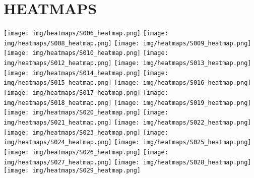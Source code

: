     \section{HEATMAPS}

        \begin{multicols}{2} \centering \noindent
            \texttt{[image: img/heatmaps/S006\_heatmap.png]}
            \texttt{[image: img/heatmaps/S008\_heatmap.png]}
            \texttt{[image: img/heatmaps/S009\_heatmap.png]}
            \texttt{[image: img/heatmaps/S010\_heatmap.png]}
            \texttt{[image: img/heatmaps/S012\_heatmap.png]}
            \texttt{[image: img/heatmaps/S013\_heatmap.png]}
            \texttt{[image: img/heatmaps/S014\_heatmap.png]}
            \texttt{[image: img/heatmaps/S015\_heatmap.png]}
            \texttt{[image: img/heatmaps/S016\_heatmap.png]}
            \texttt{[image: img/heatmaps/S017\_heatmap.png]}
            \texttt{[image: img/heatmaps/S018\_heatmap.png]}
            \texttt{[image: img/heatmaps/S019\_heatmap.png]}
            \texttt{[image: img/heatmaps/S020\_heatmap.png]}
            \texttt{[image: img/heatmaps/S021\_heatmap.png]}
            \texttt{[image: img/heatmaps/S022\_heatmap.png]}
            \texttt{[image: img/heatmaps/S023\_heatmap.png]}
            \texttt{[image: img/heatmaps/S024\_heatmap.png]}
            \texttt{[image: img/heatmaps/S025\_heatmap.png]}
            \texttt{[image: img/heatmaps/S026\_heatmap.png]}
            \texttt{[image: img/heatmaps/S027\_heatmap.png]}
            \texttt{[image: img/heatmaps/S028\_heatmap.png]}
            \texttt{[image: img/heatmaps/S029\_heatmap.png]}
        \end{multicols}
